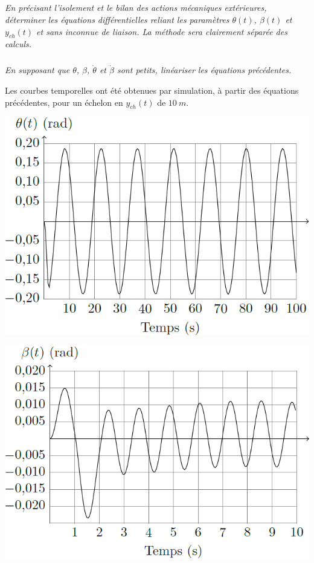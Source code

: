 \documentclass[10pt,fleqn]{article} %
\begin{document}
\begin{multicols}{2}
\subparagraph{}
\textit{En précisant l’isolement et le bilan des actions mécaniques extérieures, déterminer les équations différentielles
reliant les paramètres $\theta(t)$, $\beta(t)$  et $y_{ch}(t)$ et sans inconnue de liaison. La méthode sera clairement séparée des calculs.}
\ifprof
\begin{corrige}
\end{corrige}
\else
\fi


\subparagraph{}
\textit{En supposant que $\theta$, $\beta$, $\dot{\theta}$ et $\dot{\beta}$ sont petits, linéariser les équations précédentes.  }
\ifprof
\begin{corrige}
\end{corrige}
\else
\fi


Les courbes temporelles ont été obtenues par simulation, à partir des équations précédentes, pour un
échelon en $y_{ch}(t)$ de $\SI{10}{m}$. 


\begin{center}
\includegraphics[width=.8\linewidth]{images/fig_02}
\end{center}

\begin{center}
\includegraphics[width=.8\linewidth]{images/fig_03}
\end{center}





\end{multicols}
\end{document}
